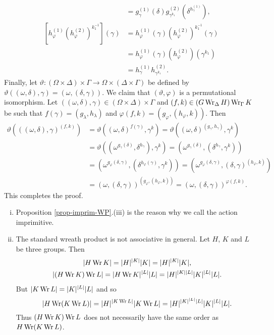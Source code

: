 \begin{sketch}
\begin{align*}
&= g_\gamma^{(1)}(\delta) g_{\gamma^{k_1}}^{(2)}(\delta^{h_\gamma^{(1)}}),
\\
\left[h_\varphi^{(1)}(h_\varphi^{(2)})^{k_1^{-1}} \right](\gamma)&=  h_\varphi^{(1)}(\gamma)(h_\varphi^{(2)})^{k_1^{-1}}(\gamma)
\\
&= h_\varphi^{(1)}(\gamma)(h_\varphi^{(2)})(\gamma^{k_1})
\\
&= h_\gamma^{(1)}h_{\gamma^{k_1}}^{(2)}.
\end{align*}
Finally, let $\vartheta:(\Omega\times \Delta)\times \Gamma \to \Omega\times (\Delta\times \Gamma)$ be defined by $\vartheta((\omega,\delta),\gamma) = (\omega,(\delta,\gamma))$. We claim that $(\vartheta,\varphi)$ is a permutational isomorphism. Let $((\omega,\delta),\gamma)\in (\Omega\times \Delta)\times \Gamma$ and $(f,k)\in (G\operatorname{Wr}_\Delta H) \operatorname{Wr}_\Gamma K$ be such that $f(\gamma)= (g_\lambda,h_\lambda)$ and $\varphi(f,k) = (g_\varphi,(h_\varphi,k))$. Then
\begin{align*}
	\vartheta\left(((\omega,\delta),\gamma)^{(f,k)}\right) &= \vartheta\left((\omega,\delta)^{f(\gamma)},\gamma^k\right) = \vartheta\left((\omega,\delta)^{(g_\gamma,h_\gamma)},\gamma^k\right)
	 \\
	 &= \vartheta\left((\omega^{g_\gamma(\delta)},\delta^{h_\gamma}),\gamma^k\right)
	 = \left(\omega^{g_\gamma(\delta)},(\delta^{h_\gamma},\gamma^k)\right)
	 \\
	 &= \left(\omega^{g_{\varphi}(\delta,\gamma)},(\delta^{h_\varphi(\gamma)},\gamma^k)\right)
	= \left(\omega^{g_{\varphi}(\delta,\gamma)},(\delta,\gamma)^{(h_\varphi,k)}\right)
	 \\
	 &= (\omega,(\delta,\gamma))^{(g_{\varphi},(h_\varphi,k))}
	  = (\omega,(\delta,\gamma))^{\varphi(f,k)}.
\end{align*}
This completes the proof.
\end{sketch}

\begin{remark}\begin{enumerate}[(i)]
		\item 	Proposition \ref{prop-imprim-WP}.(iii) is the reason why we call the action imprimitive.
		\item The standard wreath product is not associative in general. Let $H$, $K$ and $L$ be three groups. Then
\begin{gather*}
	|H \operatorname{Wr} K| = |H|^{|K|} |K| = |H|^{|K|} |K|,
	\\
	|(H \operatorname{Wr} K) \operatorname{Wr} L| = |H \operatorname{Wr} K|^{|L|} |L| = |H|^{|K||L|} |K|^{|L|} |L|.
\end{gather*}  But $|K \operatorname{Wr} L| = |K|^{|L|} |L|$ and so $$|H \operatorname{Wr} (K \operatorname{Wr} L)| = |H|^{|K \operatorname{Wr} L|} |K \operatorname{Wr} L| = |H|^{|K|^{|L|} |L|} |K|^{|L|} |L|.$$
 Thus $(H \operatorname{Wr} K) \operatorname{Wr} L$ does not necessarily have the same order  as $H \operatorname{Wr} (K \operatorname{Wr} L)$. 
	\end{enumerate}

\end{remark}

